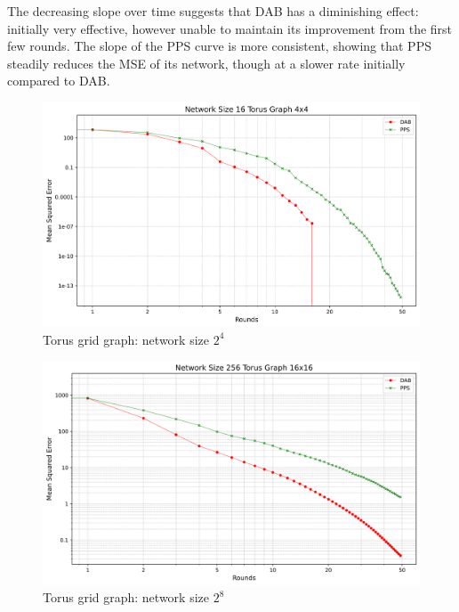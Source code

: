 The decreasing slope over time suggests that DAB has a diminishing effect: initially very effective, however unable to maintain its improvement from the first few rounds. The slope of the PPS curve is more consistent, showing that PPS steadily reduces the MSE of its network, though at a slower rate initially compared to DAB.\\
\begin{figure}[H]
    \centering
    \includegraphics[scale=0.5]{figures/torusGridGraphSimulations/DAB_vs_PPS_TG_r50_n16.png}
    \caption{Torus grid graph: network size $2^{4}$}
    \label{fig:16torusGraph}
\end{figure}

\begin{figure}[H]
    \centering
    \includegraphics[scale=0.5]{figures/torusGridGraphSimulations/DAB_vs_PPS_TG_r50_n256.png}
    \caption{Torus grid graph: network size $2^{8}$}
    \label{fig:256torusGraph}
\end{figure}

